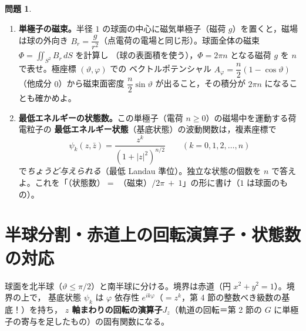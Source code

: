 \documentclass[dvipdfmx, uplatex]{jsarticle}
\theoremstyle{definition}
\newtheorem*{prob}{問題}
\begin{document}
\begin{prob}
\begin{enumerate}[start=9]
\item \textbf{単極子の磁束。}半径 $1$ の球面の中心に磁気単極子（磁荷 $g$）を置くと，磁場は球の外向き
$B_r=\dfrac{g}{r^2}$（点電荷の電場と同じ形）。球面全体の磁束 $\Phi=\displaystyle\iint_{S^2}B_r\,dS$ を計算し
（球の表面積を使う），$\Phi=2\pi n$ となる磁荷 $g$ を $n$ で表せ。極座標 $(\vartheta,\varphi)$ での
ベクトルポテンシャル $A_\varphi=\dfrac{n}{2}(1-\cos\vartheta)$（他成分 $0$）から磁束面密度
$\dfrac{n}{2}\sin\vartheta$ が出ること，その積分が $2\pi n$ になることも確かめよ。
\item \textbf{最低エネルギーの状態数。}この単極子（電荷 $n\ge0$）の磁場中を運動する荷電粒子の
\textbf{最低エネルギー状態}（基底状態）の波動関数は，複素座標で
\[
    \psi_k(z,\bar z)=\frac{z^k}{(1+|z|^2)^{n/2}}\qquad(k=0,1,2,\dots,n)
\]
で\emph{ちょうど与えられる}（最低 Landau 準位）。独立な状態の個数を $n$ で答えよ。これを「（状態数）$=$
（磁束）$/2\pi\ +\ 1$」の形に書け（$1$ は球面のもの）。
\end{enumerate}
\end{prob}

\section{半球分割・赤道上の回転演算子・状態数の対応}
球面を北半球（$\vartheta\le\pi/2$）と南半球に分ける。境界は赤道（円 $x^2+y^2=1$）。境界の上で，
基底状態 $\psi_k$ は $\varphi$ 依存性 $e^{ik\varphi}$（$=z^k$，第 4 節の整数べき級数の基底！）を持ち，
\textbf{$z$ 軸まわりの回転の演算子}$J_z$（軌道の回転＝第 2 節の $G$ に単極子の寄与を足したもの）の固有関数になる。
\end{document}

